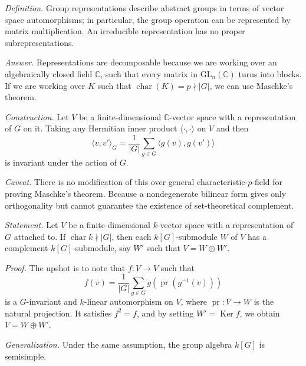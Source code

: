 \documentclass{mathproblems}
\newcommand\C{\mathbb{C}}
\newcommand\GL{\mathrm{GL}}
\DeclareMathOperator{\Ker}{Ker}
\begin{document}
\begin{questions}


\textit{Definition.} Group representations describe abstract groups in terms of vector space automorphisms; in particular, the group operation can be represented by matrix multiplication. An irreducible representation has no proper subrepresentations.

\textit{Answer.} Representations are decomposable because we are working over an algebraically closed field $\C$, such that every matrix in $\GL_n(\C)$ turns into blocks. If we are working over $K$ such that $\operatorname{char}(K)=p\nmid |G|$, we can use Maschke's theorem.

\textit{Construction.} Let $V$ be a finite-dimensional $\C$-vector space with a representation of $G$ on it. Taking any Hermitian inner product $\langle \cdot, \cdot \rangle$ on $V$ and then
$$
\langle v, v' \rangle_G=\frac{1}{|G|}\sum_{g\in G} \langle g(v), g(v') \rangle
$$
is invariant under the action of $G$.

{\color{red}
\textit{Caveat.} There is no modification of this over general characteristic-$p$-field for proving Maschke's theorem. Because a nondegenerate bilinear form gives only orthogonality but cannot guarantee the existence of set-theoretical complement.
}


\textit{Statement.} Let $V$ be a finite-dimensional $k$-vector space with a representation of $G$ attached to. If $\operatorname{char}k\nmid |G|$, then each $k[G]$-submodule $W$ of $V$ has a complement $k[G]$-submodule, say $W'$ such that $V=W\oplus W'$.

\textit{Proof.} The upshot is to note that $f: V\to V$ such that
$$
f(v)=\frac{1}{|G|}\sum_{g\in G} g(\operatorname{pr}(g^{-1}(v)))
$$
is a $G$-invariant and $k$-linear automorphism on $V$, where $\operatorname{pr}: V\to W$ is the natural projection. It satisfies $f^2=f$, and by setting $W'=\Ker f$, we obtain $V=W\oplus W'$.

{\color{violet}
\textit{Generalization.} Under the same assumption, the group algebra $k[G]$ is semisimple.}


\end{questions}
\end{document}
